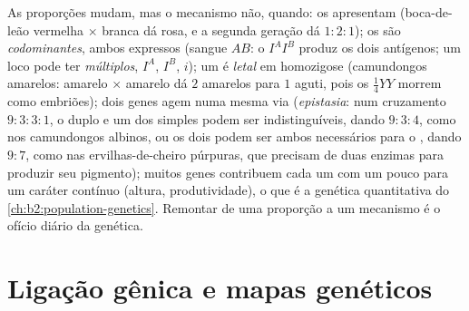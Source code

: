 \begin{proposition}\label{prop:b2:meiosis-heredity:extensions}
As proporções mudam, mas o mecanismo não, quando: os  apresentam
\emph{} (boca-de-leão vermelha $\times$ branca dá
rosa, e a segunda geração dá $1 : 2 : 1$); os  são
\emph{codominantes}, ambos expressos (sangue $AB$: o 
$I^AI^B$ produz os dois antígenos; um loco pode ter \emph{
múltiplos}, $I^A$, $I^B$, $i$); um  é \emph{letal} em homozigose
(camundongos amarelos: amarelo $\times$ amarelo dá $2$ amarelos para
$1$ aguti, pois os $\tfrac14 YY$ morrem como embriões); dois genes agem
numa mesma via (\emph{epistasia}: num cruzamento $9 : 3 : 3 : 1$, o
duplo  e um dos  simples podem ser indistinguíveis,
dando $9 : 3 : 4$, como nos camundongos albinos, ou os dois 
podem ser ambos necessários para o , dando $9 : 7$, como nas
ervilhas-de-cheiro púrpuras, que precisam de duas enzimas para
produzir seu pigmento); muitos genes contribuem cada um com um pouco
para um caráter contínuo (altura, produtividade), o que é a genética
quantitativa do \cref{ch:b2:population-genetics}. Remontar de uma proporção a um mecanismo é
o ofício diário da genética.
\end{proposition}

\section{Ligação gênica e mapas genéticos}


